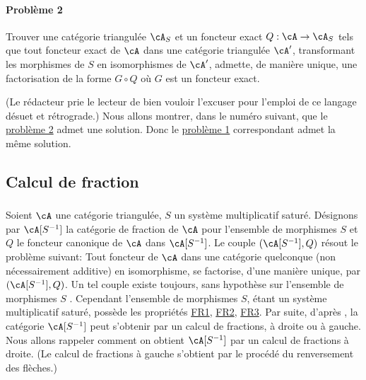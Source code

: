 \paragraph{Problème 2}
\hypertarget{VIII:prob2}{}
Trouver une catégorie triangulée $\cA_S$ et un foncteur exact 
$Q:\cA\to \cA_S$ tels que tout foncteur exact de $\cA$ dans une catégorie 
triangulée $\cA'$, transformant les morphismes de $S$ en isomorphismes de 
$\cA'$, admette, de manière unique, une factorisation de la forme 
$G\circ Q$ où $G$ est un foncteur exact. 

(Le rédacteur prie le lecteur de bien vouloir l'excuser pour l'emploi de ce 
langage désuet et rétrograde.) Nous allons montrer, dans le numéro 
suivant, que le \hyperlink{VIII:prob2}{problème 2} admet une solution. Donc 
le \hyperlink{VIII:prob1}{problème 1} correspondant admet la même solution. 










\subsection{Calcul de fraction}\label{VIII:2-3}





\subsubsection{}\label{VIII:2-3-1}

Soient $\cA$ une catégorie triangulée, $S$ un système multiplicatif 
saturé. Désignons par $\cA[S^{-1}]$ la catégorie de fraction de $\cA$ 
pour l'ensemble de morphismes $S$ et $Q$ le foncteur canonique de $\cA$ dans 
$\cA[S^{-1}]$. Le couple $(\cA[S^{-1}],Q)$ résout le problème suivant: Tout 
foncteur de $\cA$ dans une catégorie quelconque (non nécessairement 
additive)  en isomorphisme, se factorise, d'une 
manière unique, par $(\cA[S^{-1}],Q)$. Un tel couple existe toujours, sans 
hypothèse sur l'ensemble de morphismes $S$ . Cependant l'ensemble 
de morphismes $S$, étant un système multiplicatif saturé, possède les 
propriétés \hyperlink{VIII:FR1}{FR1}, \hyperlink{VIII:FR2}{FR2}, 
\hyperlink{VIII:FR3}{FR3}. Par suite, d'après , la catégorie 
$\cA[S^{-1}]$ peut s'obtenir par un calcul de fractions, à droite ou à 
gauche. Nous allons rappeler comment on obtient $\cA[S^{-1}]$ par un calcul de 
fractions à droite. (Le calcul de fractions à gauche s'obtient par le 
procédé du renversement des flèches.) 





